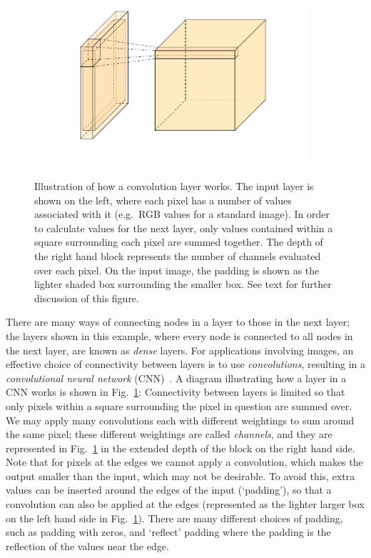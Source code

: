\documentclass[../main.tex]{subfiles}
\begin{document}
\begin{figure}[ht]
     \centering
     \begin{subfigure}[h]{0.5\textwidth}
         \includegraphics[width=\textwidth]{images/convolution.pdf}
         \caption{}
         \centering
     \end{subfigure}
     \hfill
     \caption{Illustration of how a convolution layer works. The input layer is shown on the left, where each pixel has a number of values associated with it (e.g.~RGB values for a standard image). In order to calculate values for the next layer, only values contained within a square surrounding each pixel are summed together. The depth of the right hand block represents the number of channels evaluated over each pixel. On the input image, the padding is shown as the lighter shaded box surrounding the smaller box. See text for further discussion of this figure. }
     \label{fig:conv_nn}
\end{figure}




There are many ways of connecting nodes in a layer to those in the next layer; the layers shown in this example, where every node is connected to all nodes in the next layer, are known as \emph{dense} layers. For applications involving images, an effective choice of connectivity between layers is to use \emph{convolutions}, resulting in a \emph{convolutional neural network} (CNN)~\citep{oshea_introduction_2015}. A diagram illustrating how a layer in a CNN works is shown in Fig.~\ref{fig:conv_nn}: Connectivity between layers is limited so that only pixels within a square surrounding the pixel in question are summed over. We may apply many convolutions each with different weightings to sum around the same pixel; these different weightings are called \emph{channels}, and they are represented in Fig.~\ref{fig:conv_nn} in the extended depth of the block on the right hand side. Note that for pixels at the edges we cannot apply a convolution, which makes the output smaller than the input, which may not be desirable. To avoid this, extra values can be inserted around the edges of the input (`padding'), so that a convolution can also be applied at the edges (represented as the lighter larger box on the left hand side in Fig.~\ref{fig:conv_nn}). There are many different choices of padding, such as padding with zeros, and `reflect' padding where the padding is the reflection of the values near the edge. 
\end{document}
